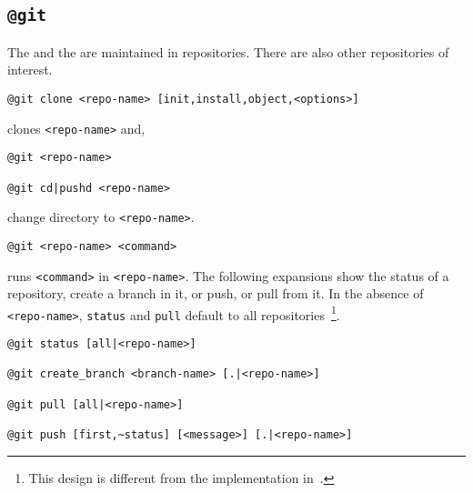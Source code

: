 \subsection{\texttt{@git}}\label{git}

The  and the  are maintained in repositories. There are also other repositories of interest.
%
\begin{verbatim}
@git clone <repo-name> [init,install,object,<options>]
\end{verbatim}
%
clones \texttt{<repo-name>} and,
%
\begin{verbatim}
@git <repo-name>

@git cd|pushd <repo-name>
\end{verbatim}
%
change directory to \texttt{<repo-name>}.
%
\begin{verbatim}
@git <repo-name> <command>
\end{verbatim}
%
runs \texttt{<command>} in \texttt{<repo-name>}. The following expansions show the status of a repository, create a branch in it, or push, or pull from it. In the absence of \texttt{<repo-name>}, \texttt{status} and \texttt{pull} default to all repositories~\footnote{This design is different from the implementation in~.}.
%
\begin{verbatim}
@git status [all|<repo-name>]

@git create_branch <branch-name> [.|<repo-name>]

@git pull [all|<repo-name>]

@git push [first,~status] [<message>] [.|<repo-name>]
\end{verbatim}